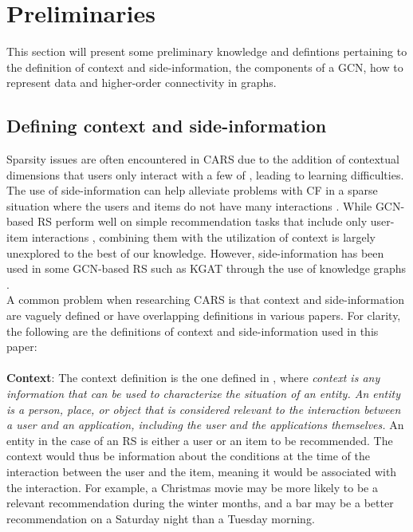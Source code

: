 \section{Preliminaries}\label{sec:preliminaries}
This section will present some preliminary knowledge and defintions pertaining to the definition of context and side-information, the components of a GCN, how to represent data and higher-order connectivity in graphs.

\subsection{Defining context and side-information}
Sparsity issues are often encountered in CARS due to the addition of contextual dimensions that users only interact with a few of \cite{SparsityCARS}, leading to learning difficulties.
The use of side-information can help alleviate problems with CF in a sparse situation where the users and items do not have many interactions \cite{KGAT}.
While GCN-based RS perform well on simple recommendation tasks that include only user-item interactions \cite{NGCF,LightGCN}, combining them with the utilization of context is largely unexplored to the best of our knowledge.
However, side-information has been used in some GCN-based RS such as KGAT through the use of knowledge graphs \cite{KGAT}.\\
A common problem when researching CARS is that context and side-information are vaguely defined or have overlapping definitions in various papers.
For clarity, the following are the definitions of context and side-information used in this paper:
\\\\
\textbf{Context}:
The context definition is the one defined in \cite{contextDefinition}, where \textit{context is any information that can be used to characterize the situation of an entity. An entity is a person, place, or object that is considered relevant to the interaction between a user and an application, including the user and the applications themselves.}
An entity in the case of an RS is either a user or an item to be recommended.
The context would thus be information about the conditions at the time of the interaction between the user and the item, meaning it would be associated with the interaction.
For example, a Christmas movie may be more likely to be a relevant recommendation during the winter months, and a bar may be a better recommendation on a Saturday night than a Tuesday morning.\\
